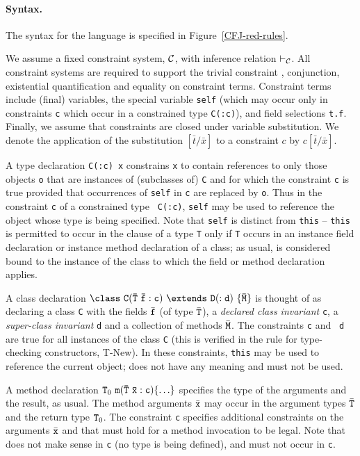 \begin{figure*}
\caption{Reduction rules for Constrained FJ}\label{CFJ-red-rules}
\end{figure*}

\paragraph{Syntax.}
The syntax for the language is specified in Figure~\ref{CFJ-red-rules}.

We assume a fixed constraint system, $\cal C$, with inference relation
$\vdash_{\cal C}$. All constraint systems are required to support the
trivial constraint \true, conjunction, existential quantification and
equality on constraint terms. Constraint terms include (final)
variables, the special variable {\tt self} (which may occur only in
constraints {\tt c} which occur in a constrained type {\tt C(:c)}),
and field selections {\tt t.f}. Finally, we assume that constraints
are closed under variable substitution. We denote the application of
the substitution $[\bar{t}/\bar{x}]$ to a constraint $c$ by
$c[\bar{t}/\bar{x}]$.

A type declaration {\tt C(:c) x} constrains {\tt x} to contain
references to only those objects {\tt o} that are instances of
(subclasses of) {\tt C} and for which the constraint {\tt c} is true
provided that occurrences of {\tt self} in {\tt c} are replaced by
{\tt o}. Thus in the constraint {\tt c} of a constrained type {\tt
C(:c)}, {\tt self} may be used to reference the object whose type is
being specified. Note that {\tt self} is distinct from {\tt this} --
{\tt this} is permitted to occur in the clause of a type {\tt T} only
if {\tt T} occurs in an instance field declaration or instance method
declaration of a class; as usual, \this{} is considered bound to the
instance of the class to which the field or method declaration
applies.

A class declaration $\tt\class \ C(\bar{T}\ \bar{f}:c)\ \extends\ D(:d)\
\{\bar{M}\}$ is thought of as declaring a class {\tt C} with the
fields $\bar{\tt f}$ (of type $\bar{\tt T}$), a {\em declared class
invariant} {\tt c}, a {\em super-class invariant} {\tt d} and a
collection of methods $\bar{\tt M}$. The constraints {\tt c} and {\tt
d} are true for all instances of the class {\tt C} (this is verified
in the rule for type-checking constructors, T-New).  In these
constraints, {\tt this} may be used to reference the current object;
\self{} does not have any meaning and must not be used.

A method declaration ${\tt T}_0\ {\tt m(\bar{\tt T}\ \bar{\tt x} :
c)\{\ldots\}}$ specifies the type of the arguments and the result, as
usual.  The method arguments $\bar{\tt x}$ may occur in the argument
types $\bar{\tt T}$ and the return type ${\tt T}_0$.  The constraint
{\tt c} specifies additional constraints on the arguments $\bar{\tt
x}$ and
\this{} that must hold for a method invocation to be legal. Note that
\self{} does not make sense in {\tt c} (no type is being defined), and must not occur in {\tt c}.

